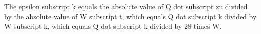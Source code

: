 The epsilon subscript k equals the absolute value of Q dot subscript zu divided by the absolute value of W subscript t, which equals Q dot subscript k divided by W subscript k, which equals Q dot subscript k divided by 28 times W.